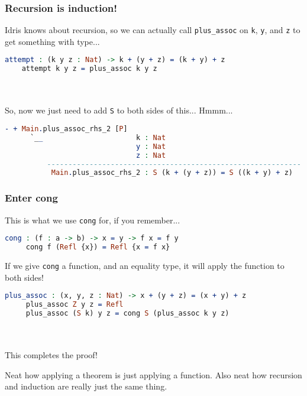 \documentclass{beamer}
\begin{document}
\begin{frame}[fragile]
  \frametitle{Recursion is induction!}

  Idris knows about recursion, so we can actually call
  \texttt{plus\_assoc} on \texttt{k}, \texttt{y}, and \texttt{z} to get
  something with type...

  \begin{lstlisting}[language=Idris]
    attempt : (k y z : Nat) -> k + (y + z) = (k + y) + z
    attempt k y z = plus_assoc k y z
  \end{lstlisting}

  \pause \\~\\

  So, now we just need to add \texttt{S} to both sides of this... Hmmm...

  \begin{lstlisting}[language=Idris]
     - + Main.plus_assoc_rhs_2 [P]
      `__                      k : Nat
                               y : Nat
                               z : Nat
          ------------------------------------------------------------
           Main.plus_assoc_rhs_2 : S (k + (y + z)) = S ((k + y) + z)
  \end{lstlisting}
\end{frame}

\begin{frame}[fragile]
  \frametitle{Enter cong}

  This is what we use \texttt{cong} for, if you remember...

  \begin{lstlisting}[language=Idris]
     cong : (f : a -> b) -> x = y -> f x = f y
     cong f (Refl {x}) = Refl {x = f x}
   \end{lstlisting}

   \pause
   If we give \texttt{cong} a function, and an equality type, it will apply the function to both sides!

   \pause
   \begin{lstlisting}[language=Idris]
     plus_assoc : (x, y, z : Nat) -> x + (y + z) = (x + y) + z
     plus_assoc Z y z = Refl
     plus_assoc (S k) y z = cong S (plus_assoc k y z)
   \end{lstlisting}

   \pause \\~\\
   This completes the proof!

   \pause

   Neat how applying a theorem is just applying a function. Also neat
   how recursion and induction are really just the same thing.
\end{frame}
\end{document}
